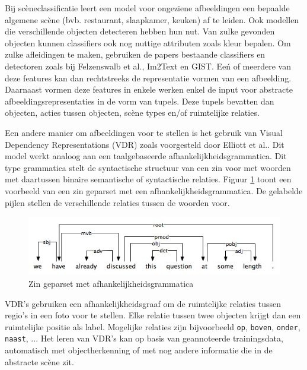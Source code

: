 Bij sc\`eneclassificatie leert een model voor ongeziene afbeeldingen een bepaalde algemene sc\`ene (bvb. restaurant, slaapkamer, keuken) af te leiden. Ook modellen die verschillende objecten detecteren hebben hun nut. Van zulke gevonden objecten kunnen classifiers ook nog nuttige attributen zoals kleur bepalen. Om zulke afleidingen te maken, gebruiken de papers bestaande classifiers en detectoren zoals bij Felzenswalb et al.\cite{Felzenszwalb2008}, Im2Text\cite{Ordonez2011} en GIST\cite{Oliva2006}. Ee\'n of meerdere van deze features kan dan rechtstreeks de representatie vormen van een afbeelding. Daarnaast vormen deze features in enkele werken\cite{Farhadi2010,Li2011,Mitchell2012,Yang2011} enkel de input voor abstracte afbeeldingsrepresentaties in de vorm van tupels. Deze tupels bevatten dan objecten, acties tussen objecten, sc\`ene types en/of ruimtelijke relaties.

Een andere manier om afbeeldingen voor te stellen is het gebruik van Visual Dependency Representations (VDR) zoals voorgesteld door Elliott et al.\cite{Elliott2013}. Dit model werkt analoog aan een taalgebaseerde afhankelijkheidsgrammatica. Dit type grammatica stelt de syntactische structuur van een zin voor met woorden met daartussen binaire semantische of syntactische relaties\cite{Jurafsky:2009:SLP:1214993}. Figuur \ref{fig:dep_grammar} toont een voorbeeld van een zin geparset met een afhankelijkheidsgrammatica. De gelabelde pijlen stellen de verschillende relaties tussen de woorden voor.

\begin{figure}[tb]
      \centering
      \includegraphics[width=\linewidth]{Images/dependencygrammar.jpg}
      \caption{Zin geparset met afhankelijkheidsgrammatica\cite{GasserNotes}}
      \label{fig:dep_grammar}
  \end{figure}  

VDR's gebruiken een afhankelijkheidsgraaf om de ruimtelijke relaties tussen regio's in een foto voor te stellen. Elke relatie tussen twee objecten krijgt dan een ruimtelijke positie als label. Mogelijke relaties zijn bijvoorbeeld \texttt{op}, \texttt{boven}, \texttt{onder}, \texttt{naast}, ... Het leren van VDR's kan op basis van geannoteerde trainingsdata, automatisch met objectherkenning\cite{Elliott2015} of met nog andere informatie die in de abstracte sc\`ene zit\cite{Gilberto2015}.  

